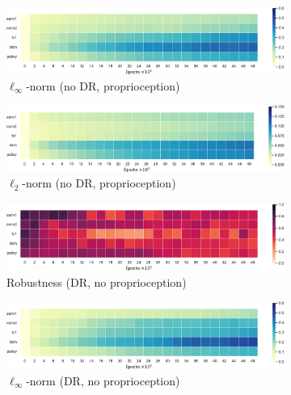 \begin{figure}
  \begin{subfigure}{0.32\textwidth}
    \includegraphics[width=\textwidth]{figures/chapter6/robustness/jaco/sensor_std/inf_dist}
    \caption{$\ell_\infty$-norm (no DR, proprioception)}
  \end{subfigure}
  \begin{subfigure}{0.32\textwidth}
    \includegraphics[width=\textwidth]{figures/chapter6/robustness/jaco/sensor_std/l2_dist}
    \caption{$\ell_2$-norm (no DR, proprioception)}
  \end{subfigure}
  \begin{subfigure}{0.32\textwidth}
    \includegraphics[width=\textwidth]{figures/chapter6/robustness/jaco/visual_random/error}
    \caption{Robustness (DR, no proprioception)}
  \end{subfigure}
  \begin{subfigure}{0.32\textwidth}
    \includegraphics[width=\textwidth]{figures/chapter6/robustness/jaco/visual_random/inf_dist}
    \caption{$\ell_\infty$-norm (DR, no proprioception)}
  \end{subfigure}
  \begin{subfigure}{0.32\textwidth}

\end{subfigure}
\end{figure}
